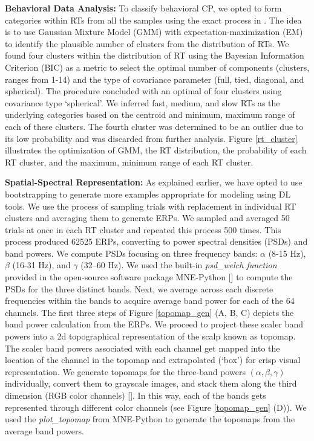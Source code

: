 \documentclass{article}
\begin{document}
\textbf{Behavioral Data Analysis:} To classify behavioral CP, we opted to form categories within RTs from all the samples using the exact process in \cite{Al_Fahad_2020}. The idea is to use Gaussian Mixture Model (GMM) with expectation-maximization (EM) to identify the plausible number of clusters from the distribution of RTs. We found four clusters within the distribution of RT using the Bayesian Information Criterion (BIC) as a metric to select the optimal number of components (clusters, ranges from 1-14) and the type of covariance parameter (full, tied, diagonal, and spherical). The procedure concluded with an optimal of four clusters using covariance type ‘spherical’. We inferred fast, medium, and slow RTs as the underlying categories based on the centroid and minimum, maximum range of each of these clusters. The fourth cluster was determined to be an outlier due to its low probability and was discarded from further analysis. Figure \ref{rt_cluster} illustrates the optimization of GMM, the RT distribution, the probability of each RT cluster, and the maximum, minimum range of each RT cluster.

\textbf{Spatial-Spectral Representation:} As explained earlier, we have opted to use bootstrapping to generate more examples appropriate for modeling using DL tools. We use the process of sampling trials with replacement in individual RT clusters and averaging them to generate ERPs. We sampled and averaged 50 trials at once in each RT cluster and repeated this process 500 times. This process produced 62525 ERPs, converting to power spectral densities (PSDs) and band powers. We compute PSDs focusing on three frequency bands: $\alpha$ (8-15 Hz), $\beta$ (16-31 Hz), and $\gamma$ (32–60 Hz). We used the built-in \emph{psd\_welch function}  provided in the open-source software package MNE-Python [\cite{mne}] to compute the PSDs for the three distinct bands. Next, we average across each discrete frequencies within the bands to acquire average band power for each of the 64 channels. The first three steps of Figure \ref{topomap_gen} (A, B, C) depicts the band power calculation from the ERPs. We proceed to project these scaler band powers into a 2d topographical representation of the scalp known as topomap. The scaler band powers associated with each channel get mapped into the location of the channel in the topomap and extrapolated (‘box’) for crisp visual representation. We generate topomaps for the three-band powers $(\alpha, \beta, \gamma)$ individually, convert them to grayscale images, and stack them along the third dimension (RGB color channels) [\cite{bashivan2015}]. In this way, each of the bands gets represented through different color channels (see Figure \ref{topomap_gen} (D)). We used the \emph{plot\_topomap} from MNE-Python to generate the topomaps from the average band powers.
\end{document}
